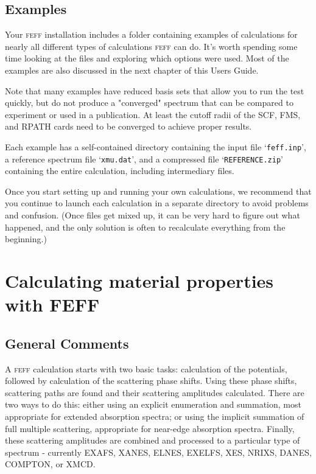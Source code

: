 \documentclass[11pt,oneside]{report} %
\newcommand{\program}[1]{\textsc{#1}}
\newcommand{\feff}{\program{feff}}
\newcommand{\file}[1]{`\texttt{#1}'}
\begin{document}
\section{Examples}
Your {\feff} installation includes a folder containing examples of calculations for nearly all different types of calculations {\feff} can do.  It's worth spending some time looking at the files 
and exploring which options were used.  Most of the examples are also discussed in the next chapter of this Users Guide.

Note that many examples have reduced basis sets that allow you to run the test quickly, but do not produce a "converged" spectrum that can be compared to experiment or used in a publication.  At least the cutoff radii of the SCF, FMS, and RPATH cards need to be converged to achieve proper results.

Each example has a self-contained directory containing the input file \file{feff.inp}, a reference spectrum file \file{xmu.dat}, and a compressed file \file{REFERENCE.zip} containing the entire calculation, including intermediary files.

Once you start setting up and running your own calculations, we recommend that you continue to launch each calculation in a separate directory to avoid problems and confusion.  (Once files get mixed up, it can be very hard to figure out what happened, and the only solution is often to recalculate everything from the beginning.)






\chapter{Calculating material properties with {FEFF}}
\label{sec:Calc-Strat-Exampl}

\section{General Comments}

A {\feff} calculation starts with two basic tasks: calculation of the potentials, followed by calculation of the scattering phase shifts.  Using these phase shifts, scattering paths are found and their scattering amplitudes calculated.  There are two ways to do this: either using an explicit enumeration and summation, most appropriate for extended absorption spectra; or using the implicit summation of full multiple scattering, appropriate for near-edge absorption spectra.  Finally, these scattering amplitudes are combined and processed to a particular type of spectrum - currently EXAFS, XANES, ELNES, EXELFS, XES, NRIXS, DANES, COMPTON, or XMCD.
\end{document}
